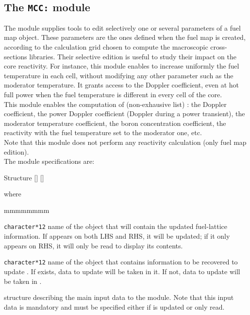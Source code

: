 \subsection{The {\tt MCC:} module}\label{sect:MCCData}

The  module supplies tools to edit selectively one or several parameters of a fuel map object. These parameters are the ones defined when the fuel map is created, according to the calculation grid chosen to compute the macroscopic cross-sections libraries. Their selective edition is useful to study their impact on the core reactivity. For instance, this module enables to increase uniformly the fuel temperature in each cell, without modifying any other parameter such as the moderator temperature. It grants access to the Doppler coefficient, even at hot full power when the fuel temperature is different in every cell of the core.\\

This module enables the computation of (non-exhausive list) : the Doppler coefficient, the power Doppler coefficient (Doppler during a power transient), the moderator temperature coefficient, the boron concentration coefficient, the reactivity with the fuel temperature set to the moderator one, etc.\\

Note that this module does not perform any reactivity calculation (only fuel map edition).\\

The  module specifications are:

\begin{DataStructure}{Structure }
$[$$]$ \moc{:=}
  $[$$]$ \moc{::}  
\end{DataStructure}

\noindent where
\begin{ListeDeDescription}{mmmmmmmm}

\item[\dusa{FLMAP1}] \texttt{character*12} name of the  object that will contain the updated fuel-lattice information. If  appears on both LHS and RHS, it will be updated; if it only appears on RHS, it will only be read to display its contents.

\item[\dusa{FLMAP2}] \texttt{character*12} name of the  object that contains information to be recovered to update . If  exists, data to update  will be taken in it. If not, data to update  will be taken in .

\item[\dstr{descmcc1}] structure describing the main input data to the  module. Note that this input data is mandatory and must be specified either if  is updated or only read.

\end{ListeDeDescription}

